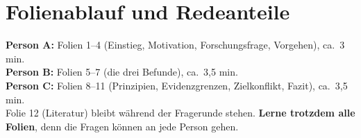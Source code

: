 \documentclass[12pt,a4paper]{article}
\begin{document}
\section{Folienablauf und Redeanteile}
\label{sec:folien}

\begin{tipp}
\textbf{Person A:} Folien 1--4 (Einstieg, Motivation, Forschungsfrage, Vorgehen), ca.\ 3 min.\\
\textbf{Person B:} Folien 5--7 (die drei Befunde), ca.\ 3,5 min.\\
\textbf{Person C:} Folien 8--11 (Prinzipien, Evidenzgrenzen, Zielkonflikt, Fazit), ca.\ 3,5 min.\\
Folie 12 (Literatur) bleibt während der Fragerunde stehen. \textbf{Lerne trotzdem alle Folien}, denn die Fragen können an jede Person gehen.
\end{tipp}
\end{document}
